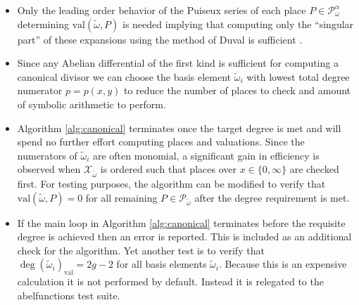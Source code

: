 \documentclass[12pt]{article}
\theoremstyle{definition}
\begin{document}
\begin{itemize}
\item Only the leading order behavior of the Puiseux series of each
  place $P \in \mathcal{P}_\omega^\alpha$ determining
  $\text{val}(\tilde{\omega},P)$ is needed implying that computing only
  the ``singular part'' of these expansions using the method of Duval is
  sufficient \cite{Duval89}.
\item Since any Abelian differential of the first kind is sufficient for
  computing a canonical divisor we can choose the basis element
  $\tilde{\omega}_i$ with lowest total degree numerator $p=p(x,y)$ to
  reduce the number of places to check and amount of symbolic arithmetic
  to perform.
\item Algorithm \ref{alg:canonical} terminates once the target degree is
  met and will spend no further effort computing places and
  valuations. Since the numerators of $\tilde{\omega}_i$ are often
  monomial, a significant gain in efficiency is observed when
  $\mathcal{X}_{\tilde{\omega}}$ is ordered such that places over $x \in
  \{0,\infty\}$ are checked first. For testing purposes, the algorithm
  can be modified to verify that $\text{val}(\tilde{\omega},P) = 0$ for
  all remaining $P \in \mathcal{P}_{\tilde{\omega}}$ after the degree
  requirement is met.
\item If the main loop in Algorithm \ref{alg:canonical} terminates
  before the requisite degree is achieved then an error is
  reported. This is included as an additional check for the
  algorithm. Yet another test is to verify that $\deg
  (\tilde{\omega}_i)_\text{val} = 2g-2$ for all basis elements
  $\tilde{\omega}_i$. Because this is an expensive calculation it is not
  performed by default. Instead it is relegated to the {\sc
    abelfunctions} test suite.
\end{itemize}
\end{document}
